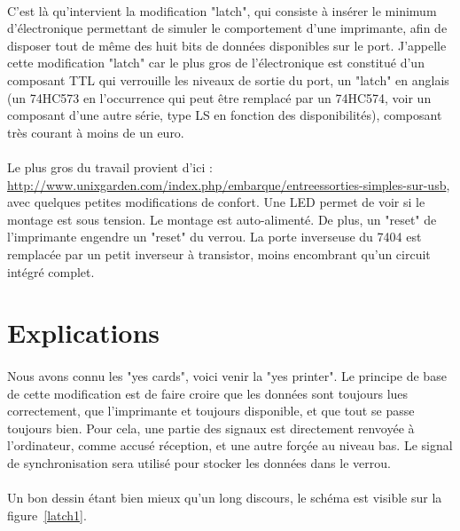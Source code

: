 \documentclass[11pt,a4paper]{book}
\begin{document}
\paragraph*{}
C'est l\`a qu'intervient la modification "latch", qui consiste \`a ins\'erer le minimum 
d'\'electronique permettant de simuler le comportement d'une imprimante, afin de disposer tout
de m\^eme des huit bits de donn\'ees disponibles sur le port. J'appelle cette modification
"latch" car le plus gros de l'\'electronique est constitu\'e d'un composant TTL qui
verrouille les niveaux de sortie du port, un "latch" en anglais (un 74HC573 en l'occurrence qui 
peut \^etre remplac\'e par un 74HC574, voir un composant d'une autre s\'erie, type LS en fonction
 des disponibilit\'es), composant tr\`es courant \`a moins de un euro.

\paragraph*{}
Le plus gros du travail provient d'ici : \url{http://www.unixgarden.com/index.php/embarque/entreessorties-simples-sur-usb}, 
avec quelques petites modifications de confort. Une LED permet de voir si le montage est sous tension. Le 
montage est auto-aliment\'e. De plus, un "reset" de l'imprimante engendre un "reset" du
verrou. La porte inverseuse du 7404 est remplac\'ee par un petit inverseur \`a transistor, moins 
encombrant qu'un circuit int\'egr\'e complet.

\section{Explications}

\paragraph*{}
Nous avons connu les "yes cards", voici venir la "yes printer". Le principe de
 base de cette modification est de faire croire que les donn\'ees sont toujours lues
 correctement, que l'imprimante et toujours disponible, et que tout se passe toujours bien.
  Pour cela, une partie des
 signaux est directement renvoy\'ee \`a l'ordinateur, comme accus\'e r\'eception, et
 une autre for\c{c}\'ee au niveau bas. Le signal de 
 synchronisation sera utilis\'e pour stocker les donn\'ees dans le verrou.
 
 \paragraph*{}
 Un bon dessin \'etant bien mieux qu'un long discours, le sch\'ema est visible sur la figure~\ref{latch1}.
 
\end{document}
